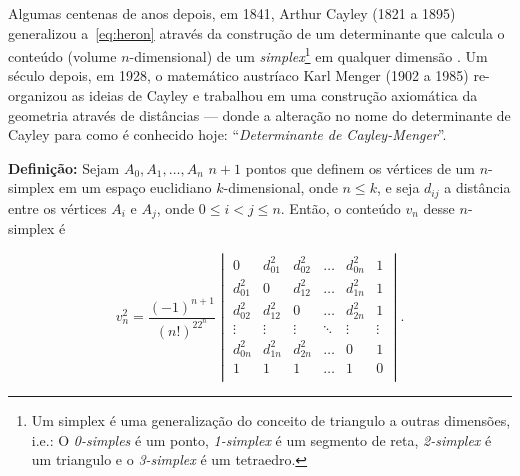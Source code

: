 \documentclass[a4paper,12pt]{article}
\begin{document}
Algumas centenas de anos depois, em 1841, Arthur Cayley (1821 a 1895) generalizou a~\ref{eq:heron} através da construção de um determinante que calcula o conteúdo (volume $n$-dimensional) de um \textit{simplex}\footnote{Um simplex é uma generalização do conceito de triangulo a outras dimensões, i.e.: O \textit{0-simples} é um ponto, \textit{1-simplex} é um segmento de reta, \textit{2-simplex} é um triangulo e o \textit{3-simplex} é um tetraedro.} em qualquer dimensão \cite{cayley1841HaronGD}. Um século depois, em 1928, o matemático austríaco Karl Menger (1902 a 1985) re-organizou as ideias de Cayley e trabalhou em uma construção axiomática da geometria através de distâncias \cite{mengerDeterminante} --- donde a alteração no nome do determinante de Cayley para como é conhecido hoje: ``\textit{Determinante de Cayley-Menger}''.  

\begin{center}
	\begin{minipage}{0.9 \linewidth}
		\textbf{Definição:} Sejam $A_0, A_1, \dots, A_n$ $n + 1$ pontos que definem os vértices de um $n$-simplex em um espaço euclidiano $k$-dimensional, onde $n\leq k$, e seja $d_{ij}$ a distância entre os vértices $A_i$ e $A_j$, onde $0\leq i < j \leq n$. Então, o conteúdo $v_n$ desse $n$-simplex é
	\end{minipage}
\end{center} 

\vspace{-0.5cm}

\begin{equation}\tag{Determinante de Cayley-Menger}
v_n^2 = \frac{(-1)^{n+1}}{(n!)^22^n}
\begin{vmatrix}
0 & d^2_{01} &  d^2_{02} & \ldots & d^2_{0n} & 1\\ 
d^2_{01} & 0 & d^2_{12} & \ldots & d^2_{1n} & 1\\ 
d^2_{02} & d^2_{12} &  0 & \ldots & d^2_{2n} & 1\\ 
\vdots & \vdots &  \vdots & \ddots & \vdots & \vdots\\ 
d^2_{0n} & d^2_{1n} & d^2_{2n}  & \ldots & 0 & 1\\ 
1 & 1 & 1  & \ldots & 1 & 0\\ 
\end{vmatrix}.
\label{determinanteCayleyMenger}
\end{equation}
\end{document}
